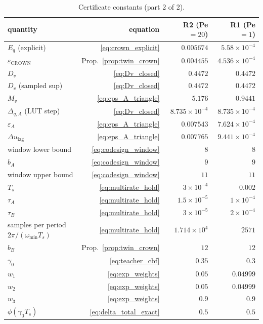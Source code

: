 \begin{table}[t]
\centering
\caption{Certificate constants (part 2 of 2).}
\label{tab:exp1_constants_b}
\footnotesize
\setlength{\tabcolsep}{4pt}
\begin{tabular}{lrrr}
\toprule
quantity & equation & R2 (Pe $= 20$) & R1 (Pe $= 1$) \\
\midrule
$E_q$ (explicit) & \eqref{eq:crown_explicit} & $0.005674$ & $5.58\times10^{-4}$ \\
$\varepsilon_{\mathrm{CROWN}}$ & Prop.~\ref{prop:twin_crown} & $0.004455$ & $4.536\times10^{-4}$ \\
$D_v$ & \eqref{eq:Dv_closed} & $0.4472$ & $0.4472$ \\
$D_v$ (sampled sup) & \eqref{eq:Dv_closed} & $0.4472$ & $0.4472$ \\
$M_v$ & \eqref{eq:eps_A_triangle} & $5.176$ & $0.9441$ \\
$\Delta_{q,A}$ (LUT step) & \eqref{eq:Dv_closed} & $8.735\times10^{-4}$ & $8.735\times10^{-4}$ \\
$\varepsilon_A$ & \eqref{eq:eps_A_triangle} & $0.007543$ & $7.624\times10^{-4}$ \\
$\Delta u_{\mathrm{lag}}$ & \eqref{eq:eps_A_triangle} & $0.007765$ & $9.441\times10^{-4}$ \\
window lower bound & \eqref{eq:codesign_window} & $8$ & $8$ \\
$b_A$ & \eqref{eq:codesign_window} & $9$ & $9$ \\
window upper bound & \eqref{eq:codesign_window} & $11$ & $11$ \\
$T_s$ & \eqref{eq:multirate_hold} & $3\times10^{-4}$ & $0.002$ \\
$\tau_A$ & \eqref{eq:multirate_hold} & $1.5\times10^{-5}$ & $1\times10^{-4}$ \\
$\tau_B$ & \eqref{eq:multirate_hold} & $3\times10^{-5}$ & $2\times10^{-4}$ \\
samples per period $2\pi/(\omega_{\min}T_s)$ & \eqref{eq:multirate_hold} & $1.714\times10^{4}$ & $2571$ \\
$b_B$ & Prop.~\ref{prop:twin_crown} & $12$ & $12$ \\
$\gamma_0$ & \eqref{eq:teacher_cbf} & $0.35$ & $0.3$ \\
$w_1$ & \eqref{eq:exp_weights} & $0.05$ & $0.04999$ \\
$w_2$ & \eqref{eq:exp_weights} & $0.05$ & $0.04999$ \\
$w_3$ & \eqref{eq:exp_weights} & $0.9$ & $0.9$ \\
$\phi(\gamma_0T_s)$ & \eqref{eq:delta_total_exact} & $0.5$ & $0.5$ \\

\end{tabular}
\end{table}
